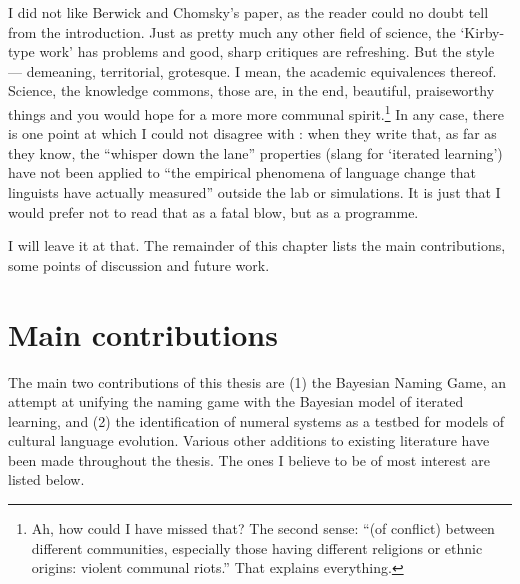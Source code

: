 \documentclass{../src/bcthesispart}
\begin{document}
\bigbreak\noindent
I did not like Berwick and Chomsky’s paper, as the reader could no doubt tell from the introduction.
Just as pretty much any other field of science, the ‘Kirby-type work’ has problems and good, sharp critiques are refreshing.
But the style — demeaning, territorial, grotesque. 
I mean, the academic equivalences thereof.
Science, the knowledge commons, those are, in the end, beautiful, praiseworthy things and you would hope for a more more communal spirit.\footnote{%
	Ah, how could I have missed that? 
	The second sense: “(of conflict) between different communities, especially those having different religions or ethnic origins: violent communal riots.”
	That explains everything.
}
In any case, there is one point at which I could not disagree with \textcite{Berwick2017}: when they write that, as far as they know, the “whisper down the lane” properties (slang for ‘iterated learning’) have not been applied to “the empirical phenomena of language change that linguists have actually measured” outside the lab or simulations. 
It is just that I would prefer not to read that as a fatal blow, but as a programme.


\bigbreak\noindent
I will leave it at that. 
The remainder of this chapter lists the main contributions, some points of discussion and future work. 


\section{Main contributions}


The main two contributions of this thesis are (1) the Bayesian Naming Game, an attempt at unifying the naming game with the Bayesian model of iterated learning, and (2) the identification of numeral systems as a testbed for models of cultural language evolution. 
Various other additions to existing literature have been made throughout the thesis. The ones I believe to be of most interest are listed below.
\end{document}
